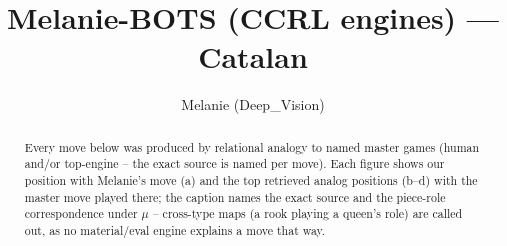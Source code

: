 \documentclass[11pt]{article}
\title{Melanie-BOTS (CCRL engines) — Catalan}
\author{Melanie (Deep\_Vision)}
\date{}
\begin{document}
\maketitle

\begin{abstract}Every move below was produced by relational analogy to named master games (human and/or top-engine -- the exact source is named per move). Each figure shows our position with Melanie's move (a) and the top retrieved analog positions (b--d) with the master move played there; the caption names the exact source and the piece-role correspondence under $\mu$ -- cross-type maps (a rook playing a queen's role) are called out, as no material/eval engine explains a move that way.\end{abstract}

\begin{figure}[p]\centering
\begin{subfigure}{0.46\textwidth}\centering
\resizebox{\linewidth}{!}{%
\newchessgame
\chessboard[
  setfen={rnbq1rk1/ppp1bppp/4pn2/8/2pP4/5NP1/PP2PPBP/RNBQ1RK1 w - - 0 7},
  showmover=false,
  pgfstyle=straightmove, color=movearrow, markmove={f3-e5}
]}
\caption{}
\end{subfigure}\hfill
\begin{subfigure}{0.46\textwidth}\centering
\resizebox{\linewidth}{!}{%
\newchessgame
\chessboard[
  setfen={rnbq1rk1/ppp1bppp/4pn2/8/2pP4/5NP1/PP2PPBP/RNBQ1RK1 w - - 0 7},
  showmover=false,
  pgfstyle=straightmove, color=movearrow, markmove={f3-e5}
]}
\caption{}
\end{subfigure}
\\[4pt]
\begin{subfigure}{0.46\textwidth}\centering
\resizebox{\linewidth}{!}{%
\newchessgame
\chessboard[
  setfen={rnbq1rk1/ppp1bppp/4pn2/8/2pP4/5NP1/PP2PPBP/RNBQ1RK1 w - - 0 7},
  showmover=false,
  pgfstyle=straightmove, color=movearrow, markmove={f3-e5}
]}
\caption{}
\end{subfigure}\hfill
\begin{subfigure}{0.46\textwidth}\centering
\resizebox{\linewidth}{!}{%
\newchessgame
\chessboard[
  setfen={rnbq1rk1/ppp1bppp/4pn2/8/2pP4/5NP1/PP2PPBP/RNBQ1RK1 w - - 0 7},
  showmover=false,
  pgfstyle=straightmove, color=movearrow, markmove={f3-e5}
]}
\caption{}
\end{subfigure}

\end{figure}
\end{document}
